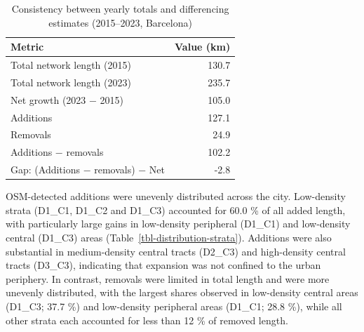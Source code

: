 \documentclass[
]{article}
\begin{document}
\begin{longtable}[]{@{}lr@{}}

\caption{\label{tbl-consistency}Consistency between yearly totals and
differencing estimates (2015--2023, Barcelona)}

\tabularnewline

\toprule\noalign{}
Metric & Value (km) \\
\midrule\noalign{}
\endhead
\bottomrule\noalign{}
\endlastfoot
Total network length (2015) & 130.7 \\
Total network length (2023) & 235.7 \\
Net growth (2023 − 2015) & 105.0 \\
Additions & 127.1 \\
Removals & 24.9 \\
Additions − removals & 102.2 \\
Gap: (Additions − removals) − Net & -2.8 \\

\end{longtable}

OSM-detected additions were unevenly distributed across the city.
Low-density strata (D1\_C1, D1\_C2 and D1\_C3) accounted for 60.0 \% of
all added length, with particularly large gains in low-density
peripheral (D1\_C1) and low-density central (D1\_C3) areas
(Table~\ref{tbl-distribution-strata}). Additions were also substantial
in medium-density central tracts (D2\_C3) and high-density central
tracts (D3\_C3), indicating that expansion was not confined to the urban
periphery. In contrast, removals were limited in total length and were
more unevenly distributed, with the largest shares observed in
low-density central areas (D1\_C3; 37.7 \%) and low-density peripheral
areas (D1\_C1; 28.8 \%), while all other strata each accounted for less
than 12 \% of removed length.
\end{document}
